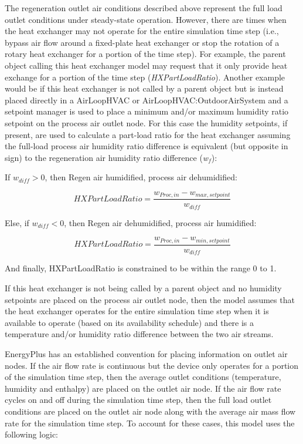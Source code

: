 The regeneration outlet air conditions described above represent the full load outlet conditions under steady-state operation. However, there are times when the heat exchanger may not operate for the entire simulation time step (i.e., bypass air flow around a fixed-plate heat exchanger or stop the rotation of a rotary heat exchanger for a portion of the time step). For example, the parent object calling this heat exchanger model may request that it only provide heat exchange for a portion of the time step (\emph{HXPartLoadRatio}). Another example would be if this heat exchanger is not called by a parent object but is instead placed directly in a AirLoopHVAC or AirLoopHVAC:OutdoorAirSystem and a setpoint manager is used to place a minimum and/or maximum humidity ratio setpoint on the process air outlet node. For this case the humidity setpoints, if present, are used to calculate a part-load ratio for the heat exchanger assuming the full-load process air humidity ratio difference is equivalent (but opposite in sign) to the regeneration air humidity ratio difference (\emph{w\(_{f}\)}):

If $w_{diff}>0$, then Regen air humidified, process air dehumidified:

\begin{equation}
  HXPartLoadRatio = \frac{w_{Proc,in} - w_{max, setpoint}}{w_{diff}}
\end{equation}

Else, if $w_{diff} <0$, then Regen air dehumidified, process air humidified:

\begin{equation}
  HXPartLoadRatio = \frac{w_{Proc,in} - w_{min, setpoint}}{w_{diff}}
\end{equation}

And finally, HXPartLoadRatio is constrained to be within the range 0 to 1.

If this heat exchanger is not being called by a parent object and no humidity setpoints are placed on the process air outlet node, then the model assumes that the heat exchanger operates for the entire simulation time step when it is available to operate (based on its availability schedule) and there is a temperature and/or humidity ratio difference between the two air streams.

EnergyPlus has an established convention for placing information on outlet air nodes. If the air flow rate is continuous but the device only operates for a portion of the simulation time step, then the average outlet conditions (temperature, humidity and enthalpy) are placed on the outlet air node. If the air flow rate cycles on and off during the simulation time step, then the full load outlet conditions are placed on the outlet air node along with the average air mass flow rate for the simulation time step. To account for these cases, this model uses the following logic:

